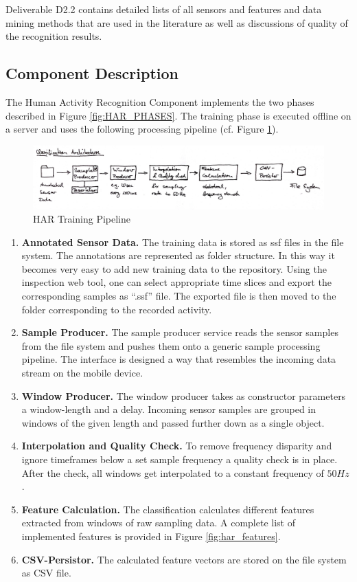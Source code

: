 Deliverable D2.2 contains detailed lists of all sensors and features
and data mining methods that are used in the literature as well as
discussions of quality of the recognition results.

\subsection{Component Description}\label{sec:har_component}

The Human Activity Recognition Component implements the two phases
described in Figure \ref{fig:HAR_PHASES}. The training phase is
executed offline on a server and uses the following processing
pipeline (cf. Figure \ref{fig:classification_architecture}).

\begin{figure}[htbp]
\centering
\includegraphics[width=\textwidth]{img/har/classification_architecture.jpg}
\caption{HAR Training Pipeline}\label{fig:classification_architecture}
\end{figure}

\begin{enumerate}
  \item {\bf Annotated Sensor Data.} The training data is stored as
    ssf files in the file system. The annotations are represented as
    folder structure. In this way it becomes very easy to add new
    training data to the repository. Using the inspection web tool,
    one can select appropriate time slices and export the
    corresponding samples as ``.ssf'' file. The exported file is then
    moved to the folder corresponding to the recorded activity.
  \item {\bf Sample Producer.} The sample producer service reads the 
    sensor samples from the file system and pushes them onto a generic 
    sample processing pipeline. The interface is designed a way that
    resembles the incoming data stream on the mobile device.
  \item {\bf Window Producer.} The window producer takes as
    constructor parameters a window-length and a delay. Incoming
    sensor samples are grouped in windows of the given length and
    passed further down as a single object.
  \item {\bf Interpolation and Quality Check.}  To remove frequency
    disparity and ignore timeframes below a set sample frequency a
    quality check is in place. After the check, all windows get
    interpolated to a constant frequency of $50Hz$.
  \item {\bf Feature Calculation.} The classification calculates
    different features extracted from windows of raw sampling data. A
    complete list of implemented features is provided in Figure
    \ref{fig:har_features}.
  \item {\bf CSV-Persistor.} The calculated feature vectors are stored
    on the file system as CSV file. 
\end{enumerate}


